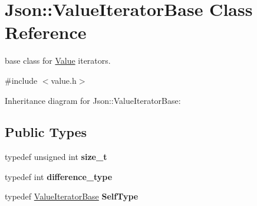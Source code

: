 \hypertarget{class_json_1_1_value_iterator_base}{\section{Json\+:\+:Value\+Iterator\+Base Class Reference}
\label{class_json_1_1_value_iterator_base}
}


base class for \hyperlink{class_json_1_1_value}{Value} iterators.  




{\ttfamily \#include $<$value.\+h$>$}



Inheritance diagram for Json\+:\+:Value\+Iterator\+Base\+:
\subsection*{Public Types}
\begin{DoxyCompactItemize}
\item 
\hypertarget{class_json_1_1_value_iterator_base_a9d3a3c7ce5cdefe23cb486239cf07bb5}{typedef unsigned int {\bfseries size\+\_\+t}}\label{class_json_1_1_value_iterator_base_a9d3a3c7ce5cdefe23cb486239cf07bb5}

\item 
\hypertarget{class_json_1_1_value_iterator_base_a4e44bf8cbd17ec8d6e2c185904a15ebd}{typedef int {\bfseries difference\+\_\+type}}\label{class_json_1_1_value_iterator_base_a4e44bf8cbd17ec8d6e2c185904a15ebd}

\item 
\hypertarget{class_json_1_1_value_iterator_base_a9d2a940d03ea06d20d972f41a89149ee}{typedef \hyperlink{class_json_1_1_value_iterator_base}{Value\+Iterator\+Base} {\bfseries Self\+Type}}\label{class_json_1_1_value_iterator_base_a9d2a940d03ea06d20d972f41a89149ee}

\end{DoxyCompactItemize}
